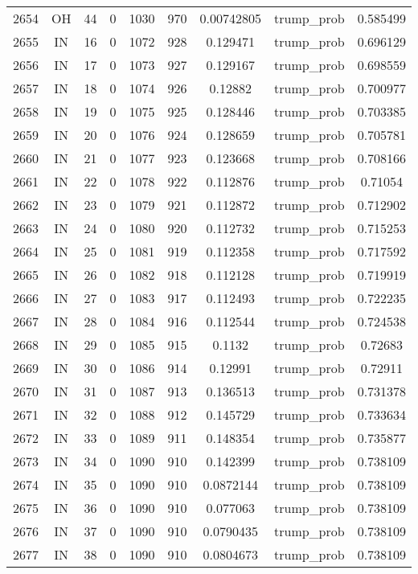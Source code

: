 \documentclass[12pt,a4paper]{article}
\begin{document}
\begin{tabular}{r|cccccccc}
	2654 & OH & 44 & 0 & 1030 & 970 & 0.00742805 & trump\_prob & 0.585499 \\
	2655 & IN & 16 & 0 & 1072 & 928 & 0.129471 & trump\_prob & 0.696129 \\
	2656 & IN & 17 & 0 & 1073 & 927 & 0.129167 & trump\_prob & 0.698559 \\
	2657 & IN & 18 & 0 & 1074 & 926 & 0.12882 & trump\_prob & 0.700977 \\
	2658 & IN & 19 & 0 & 1075 & 925 & 0.128446 & trump\_prob & 0.703385 \\
	2659 & IN & 20 & 0 & 1076 & 924 & 0.128659 & trump\_prob & 0.705781 \\
	2660 & IN & 21 & 0 & 1077 & 923 & 0.123668 & trump\_prob & 0.708166 \\
	2661 & IN & 22 & 0 & 1078 & 922 & 0.112876 & trump\_prob & 0.71054 \\
	2662 & IN & 23 & 0 & 1079 & 921 & 0.112872 & trump\_prob & 0.712902 \\
	2663 & IN & 24 & 0 & 1080 & 920 & 0.112732 & trump\_prob & 0.715253 \\
	2664 & IN & 25 & 0 & 1081 & 919 & 0.112358 & trump\_prob & 0.717592 \\
	2665 & IN & 26 & 0 & 1082 & 918 & 0.112128 & trump\_prob & 0.719919 \\
	2666 & IN & 27 & 0 & 1083 & 917 & 0.112493 & trump\_prob & 0.722235 \\
	2667 & IN & 28 & 0 & 1084 & 916 & 0.112544 & trump\_prob & 0.724538 \\
	2668 & IN & 29 & 0 & 1085 & 915 & 0.1132 & trump\_prob & 0.72683 \\
	2669 & IN & 30 & 0 & 1086 & 914 & 0.12991 & trump\_prob & 0.72911 \\
	2670 & IN & 31 & 0 & 1087 & 913 & 0.136513 & trump\_prob & 0.731378 \\
	2671 & IN & 32 & 0 & 1088 & 912 & 0.145729 & trump\_prob & 0.733634 \\
	2672 & IN & 33 & 0 & 1089 & 911 & 0.148354 & trump\_prob & 0.735877 \\
	2673 & IN & 34 & 0 & 1090 & 910 & 0.142399 & trump\_prob & 0.738109 \\
	2674 & IN & 35 & 0 & 1090 & 910 & 0.0872144 & trump\_prob & 0.738109 \\
	2675 & IN & 36 & 0 & 1090 & 910 & 0.077063 & trump\_prob & 0.738109 \\
	2676 & IN & 37 & 0 & 1090 & 910 & 0.0790435 & trump\_prob & 0.738109 \\
	2677 & IN & 38 & 0 & 1090 & 910 & 0.0804673 & trump\_prob & 0.738109 \\

\end{tabular}
\end{document}
